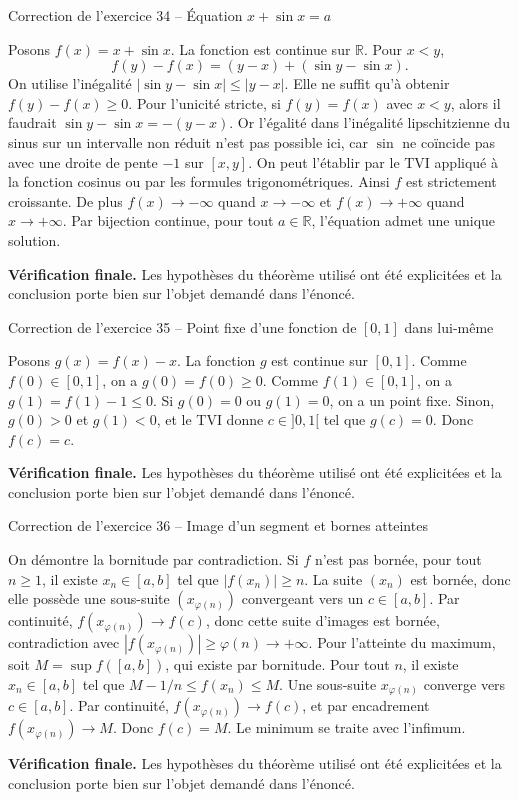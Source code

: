 \documentclass[11pt,a4paper]{article}
\newcommand{\R}{\mathbb{R}}
\begin{document}
\begin{corrbox}{Correction de l'exercice 34 -- Équation $x+\sin x=a$}

Posons $f(x)=x+\sin x$. La fonction est continue sur $\R$. Pour $x<y$,
\[
f(y)-f(x)=(y-x)+(\sin y-\sin x).
\]
On utilise l'inégalité $|\sin y-\sin x|\leq |y-x|$. Elle ne suffit qu'à obtenir $f(y)-f(x)\geq0$. Pour l'unicité stricte, si $f(y)=f(x)$ avec $x<y$, alors il faudrait $\sin y-\sin x=-(y-x)$. Or l'égalité dans l'inégalité lipschitzienne du sinus sur un intervalle non réduit n'est pas possible ici, car $\sin$ ne coïncide pas avec une droite de pente $-1$ sur $[x,y]$. On peut l'établir par le TVI appliqué à la fonction cosinus ou par les formules trigonométriques. Ainsi $f$ est strictement croissante. De plus $f(x)\to-\infty$ quand $x\to-\infty$ et $f(x)\to+\infty$ quand $x\to+\infty$. Par bijection continue, pour tout $a\in\R$, l'équation admet une unique solution.

\medskip
\textbf{Vérification finale.} Les hypothèses du théorème utilisé ont été explicitées et la conclusion porte bien sur l'objet demandé dans l'énoncé.
\end{corrbox}


\begin{corrbox}{Correction de l'exercice 35 -- Point fixe d'une fonction de $[0,1]$ dans lui-même}

Posons $g(x)=f(x)-x$. La fonction $g$ est continue sur $[0,1]$. Comme $f(0)\in[0,1]$, on a $g(0)=f(0)\geq0$. Comme $f(1)\in[0,1]$, on a $g(1)=f(1)-1\leq0$. Si $g(0)=0$ ou $g(1)=0$, on a un point fixe. Sinon, $g(0)>0$ et $g(1)<0$, et le TVI donne $c\in]0,1[$ tel que $g(c)=0$. Donc $f(c)=c$.

\medskip
\textbf{Vérification finale.} Les hypothèses du théorème utilisé ont été explicitées et la conclusion porte bien sur l'objet demandé dans l'énoncé.
\end{corrbox}


\begin{corrbox}{Correction de l'exercice 36 -- Image d'un segment et bornes atteintes}

On démontre la bornitude par contradiction. Si $f$ n'est pas bornée, pour tout $n\geq1$, il existe $x_n\in[a,b]$ tel que $|f(x_n)|\geq n$. La suite $(x_n)$ est bornée, donc elle possède une sous-suite $(x_{\varphi(n)})$ convergeant vers un $c\in[a,b]$. Par continuité, $f(x_{\varphi(n)})\to f(c)$, donc cette suite d'images est bornée, contradiction avec $|f(x_{\varphi(n)})|\geq\varphi(n)\to+\infty$.
Pour l'atteinte du maximum, soit $M=\sup f([a,b])$, qui existe par bornitude. Pour tout $n$, il existe $x_n\in[a,b]$ tel que $M-1/n\leq f(x_n)\leq M$. Une sous-suite $x_{\varphi(n)}$ converge vers $c\in[a,b]$. Par continuité, $f(x_{\varphi(n)})\to f(c)$, et par encadrement $f(x_{\varphi(n)})\to M$. Donc $f(c)=M$. Le minimum se traite avec l'infimum.

\medskip
\textbf{Vérification finale.} Les hypothèses du théorème utilisé ont été explicitées et la conclusion porte bien sur l'objet demandé dans l'énoncé.
\end{corrbox}
\end{document}
